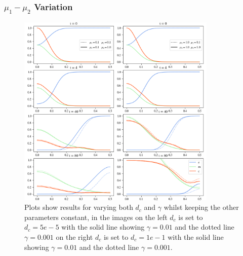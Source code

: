 \subsubsection*{$\mu_1 - \mu_2$ Variation}
\begin{figure}[h]
    \centering
    \includegraphics[width=0.85\textwidth]{resources/images/prolif_mu_1_mu_2_variation.png}
    \caption{Plots show results for varying both $d_c$ and $\gamma$ whilst keeping the other parameters constant, in the images on the left $d_c$ is set to $d_c=5e-5$ with the solid line showing $\gamma = 0.01$ and the dotted line $\gamma=0.001$ on the right $d_c$ is set to $d_c=1e-1$ with the solid line showing $\gamma = 0.01$ and the dotted line $\gamma=0.001$.}
    \label{fig:dc_gamma_variation}
\end{figure}

